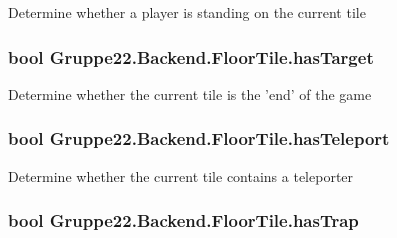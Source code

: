 Determine whether a player is standing on the current tile 

\hypertarget{class_gruppe22_1_1_backend_1_1_floor_tile_af31534372c3138a5e67ce531adead203}{
\subsubsection[{has\-Target}]{\setlength{\rightskip}{0pt plus 5cm}bool Gruppe22.\-Backend.\-Floor\-Tile.\-has\-Target\hspace{0.3cm}{\ttfamily [get]}}}\label{class_gruppe22_1_1_backend_1_1_floor_tile_af31534372c3138a5e67ce531adead203}


Determine whether the current tile is the 'end' of the game 

\hypertarget{class_gruppe22_1_1_backend_1_1_floor_tile_a477120ecb285df256f1761cd1774bf16}{
\subsubsection[{has\-Teleport}]{\setlength{\rightskip}{0pt plus 5cm}bool Gruppe22.\-Backend.\-Floor\-Tile.\-has\-Teleport\hspace{0.3cm}{\ttfamily [get]}}}\label{class_gruppe22_1_1_backend_1_1_floor_tile_a477120ecb285df256f1761cd1774bf16}


Determine whether the current tile contains a teleporter 

\hypertarget{class_gruppe22_1_1_backend_1_1_floor_tile_a6d2ae9e7cbc9de3a2c39ddd0fbf2cee6}{
\subsubsection[{has\-Trap}]{\setlength{\rightskip}{0pt plus 5cm}bool Gruppe22.\-Backend.\-Floor\-Tile.\-has\-Trap\hspace{0.3cm}{\ttfamily [get]}}}\label{class_gruppe22_1_1_backend_1_1_floor_tile_a6d2ae9e7cbc9de3a2c39ddd0fbf2cee6}



